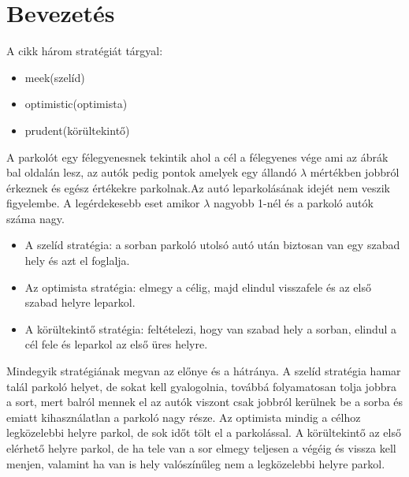 \documentclass{article}
\begin{document}
	\section{Bevezetés}
	A cikk három stratégiát tárgyal:
	\begin{itemize}
		\item meek(szelíd)
		\item optimistic(optimista)
		\item prudent(körültekintő)
	\end{itemize}
	A parkolót egy félegyenesnek tekintik ahol a cél a félegyenes vége ami az ábrák bal oldalán lesz, az autók pedig pontok amelyek egy állandó $\lambda$ mértékben jobbról érkeznek és egész értékekre parkolnak.Az autó leparkolásának idejét nem veszik figyelembe. A legérdekesebb eset amikor $\lambda$ nagyobb 1-nél és a parkoló autók száma nagy.
	\begin{itemize}
	\item A szelíd stratégia: a sorban parkoló utolsó autó után biztosan van egy szabad hely és azt el foglalja.
	\item Az optimista stratégia: elmegy a célig, majd elindul visszafele és az első szabad helyre leparkol.
	\item A körültekintő stratégia: feltételezi, hogy van szabad hely a sorban, elindul a cél fele és leparkol az első üres helyre.
	\end{itemize}
	Mindegyik stratégiának megvan az előnye és a hátránya. A szelíd stratégia hamar talál parkoló helyet, de sokat kell gyalogolnia, továbbá folyamatosan tolja jobbra a sort, mert balról mennek el az autók viszont csak jobbról kerülnek be a sorba és emiatt kihasználatlan a parkoló nagy része. Az optimista mindig a célhoz legközelebbi helyre parkol, de sok időt tölt el a parkolással. A körültekintő az első elérhető helyre parkol, de ha tele van a sor elmegy teljesen a végéig és vissza kell menjen, valamint ha van is hely valószínűleg nem a legközelebbi helyre parkol.
\end{document}
